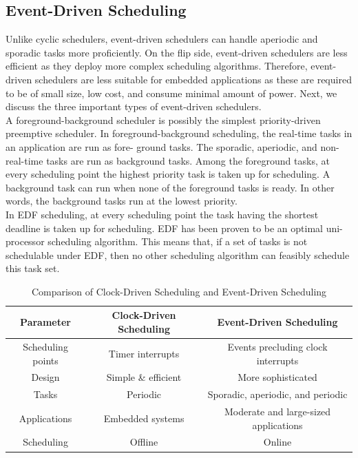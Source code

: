 \documentclass[12pt]{report}
\begin{document}
\subsection{Event-Driven Scheduling}
Unlike cyclic schedulers, event-driven schedulers can handle aperiodic and sporadic tasks more proficiently. On the flip side, event-driven schedulers are less efficient as they deploy more complex scheduling algorithms. Therefore, event-driven schedulers are less suitable for embedded applications as these are required to be of small size, low cost, and consume minimal amount of power. Next, we discuss the three important types of event-driven schedulers.\\

A foreground-background scheduler is possibly the simplest priority-driven preemptive scheduler. In foreground-background scheduling, the real-time tasks in an application are run as fore- ground tasks. The sporadic, aperiodic, and non-real-time tasks are run as background tasks. Among the foreground tasks, at every scheduling point the highest priority task is taken up for scheduling. A background task can run when none of the foreground tasks is ready. In other words, the background tasks run at the lowest priority. \\

In EDF scheduling, at every scheduling point the task having the shortest deadline is taken up for scheduling. EDF has been proven to be an optimal  uni-processor scheduling algorithm. This means that, if a set of tasks is not schedulable under EDF, then no other scheduling algorithm can feasibly schedule this task set.
\begin{table}[h]
\centering
\begin{tabular}{|c|c|c|}
 \hline
 \textbf{Parameter} &  \textbf{Clock-Driven Scheduling} & \textbf{Event-Driven Scheduling}\\
 \hline \hline
 Scheduling points & Timer interrupts & Events precluding clock interrupts\\ 
 \hline
 Design & Simple \& efficient & More sophisticated \\
 \hline
 Tasks & Periodic & Sporadic, aperiodic, and periodic \\
 \hline
 Applications & Embedded systems &  Moderate and
large-sized applications \\ 
 \hline
 Scheduling & Offline & Online \\
 \hline
\end{tabular}
\caption{Comparison of Clock-Driven Scheduling and Event-Driven Scheduling}
\label{table:3}
\end{table}
\end{document}
